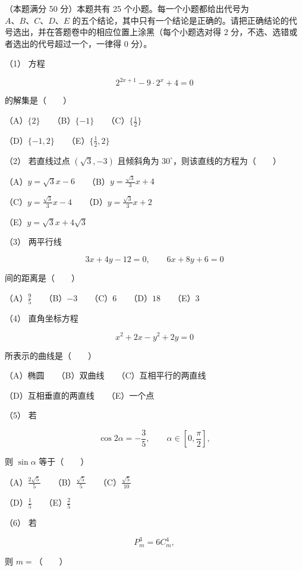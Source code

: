 \begin{question}
（本题满分 50 分）本题共有 25 个小题。每一个小题都给出代号为 $A\text{、}B\text{、}C\text{、}D\text{、}E$ 的五个结论，其中只有一个结论是正确的。请把正确结论的代号选出，并在答题卷中的相应位置上涂黑（每个小题选对得 2 分，不选、选错或者选出的代号超过一个，一律得 0 分）。

（1） 方程

\nopagebreak[4]
\[
2^{2x+1}-9\cdot2^x+4=0
\]

的解集是\mbox{（　　）}

（A）$\{2\}$　　（B）$\{-1\}$　　（C）$\{\frac12\}$

（D）$\{-1,2\}$　　（E）$\{\frac12,2\}$

（2） 若直线过点 $(\sqrt3,-3)$ 且倾斜角为 $30^\circ$，则该直线的方程为\mbox{（　　）}

（A）$y=\sqrt3x-6$　　（B）$y=\frac{\sqrt3}{3}x+4$

（C）$y=\frac{\sqrt3}{3}x-4$　　（D）$y=\frac{\sqrt3}{3}x+2$

（E）$y=\sqrt3x+4\sqrt3$

（3） 两平行线

\nopagebreak[4]
\[
3x+4y-12=0,\qquad 6x+8y+6=0
\]

间的距离是\mbox{（　　）}

（A）$\frac95$　　（B）$-3$　　（C）$6$　　（D）$18$　　（E）$3$

（4） 直角坐标方程

\nopagebreak[4]
\[
x^2+2x-y^2+2y=0
\]

所表示的曲线是\mbox{（　　）}

（A）椭圆　　（B）双曲线　　（C）互相平行的两直线

（D）互相垂直的两直线　　（E）一个点

（5） 若

\nopagebreak[4]
\[
\cos2\alpha=-\frac35,\qquad \alpha\in\left[0,\frac\pi2\right],
\]

则 $\sin\alpha$ 等于\mbox{（　　）}

（A）$\frac{2\sqrt5}{5}$　　（B）$\frac{\sqrt5}{5}$　　（C）$\frac{\sqrt5}{10}$

（D）$\frac15$　　（E）$\frac25$

（6） 若

\nopagebreak[4]
\[
P_m^3=6C_m^4,
\]

则 $m=$\mbox{（　　）}


\end{question}

